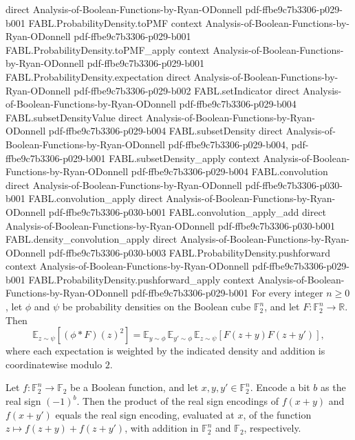 \begin{theorem}
  {direct}
  {Analysis-of-Boolean-Functions-by-Ryan-ODonnell}
  {pdf-ffbe9c7b3306-p029-b001}
\proofstep
  {FABL.ProbabilityDensity.toPMF}
  {context}
  {Analysis-of-Boolean-Functions-by-Ryan-ODonnell}
  {pdf-ffbe9c7b3306-p029-b001}
\proofstep
  {FABL.ProbabilityDensity.toPMF_apply}
  {context}
  {Analysis-of-Boolean-Functions-by-Ryan-ODonnell}
  {pdf-ffbe9c7b3306-p029-b001}
\proofstep
  {FABL.ProbabilityDensity.expectation}
  {direct}
  {Analysis-of-Boolean-Functions-by-Ryan-ODonnell}
  {pdf-ffbe9c7b3306-p029-b002}
\proofstep
  {FABL.setIndicator}
  {direct}
  {Analysis-of-Boolean-Functions-by-Ryan-ODonnell}
  {pdf-ffbe9c7b3306-p029-b004}
\proofstep
  {FABL.subsetDensityValue}
  {direct}
  {Analysis-of-Boolean-Functions-by-Ryan-ODonnell}
  {pdf-ffbe9c7b3306-p029-b004}
\proofstep
  {FABL.subsetDensity}
  {direct}
  {Analysis-of-Boolean-Functions-by-Ryan-ODonnell}
  {pdf-ffbe9c7b3306-p029-b004,
    pdf-ffbe9c7b3306-p029-b001}
\proofstep
  {FABL.subsetDensity_apply}
  {context}
  {Analysis-of-Boolean-Functions-by-Ryan-ODonnell}
  {pdf-ffbe9c7b3306-p029-b004}
\proofstep
  {FABL.convolution}
  {direct}
  {Analysis-of-Boolean-Functions-by-Ryan-ODonnell}
  {pdf-ffbe9c7b3306-p030-b001}
\proofstep
  {FABL.convolution_apply}
  {direct}
  {Analysis-of-Boolean-Functions-by-Ryan-ODonnell}
  {pdf-ffbe9c7b3306-p030-b001}
\proofstep
  {FABL.convolution_apply_add}
  {direct}
  {Analysis-of-Boolean-Functions-by-Ryan-ODonnell}
  {pdf-ffbe9c7b3306-p030-b001}
\proofstep
  {FABL.density_convolution_apply}
  {direct}
  {Analysis-of-Boolean-Functions-by-Ryan-ODonnell}
  {pdf-ffbe9c7b3306-p030-b003}
\proofstep
  {FABL.ProbabilityDensity.pushforward}
  {context}
  {Analysis-of-Boolean-Functions-by-Ryan-ODonnell}
  {pdf-ffbe9c7b3306-p029-b001}
\proofstep
  {FABL.ProbabilityDensity.pushforward_apply}
  {context}
  {Analysis-of-Boolean-Functions-by-Ryan-ODonnell}
  {pdf-ffbe9c7b3306-p029-b001}
For every integer $n \ge 0$, let $\phi$ and $\psi$ be probability densities on the
Boolean cube $\mathbb{F}_2^n$, and let $F:\mathbb{F}_2^n\to\mathbb{R}$. Then
\[
\mathbb{E}_{z\sim\psi}\!\left[(\phi*F)(z)^2\right]
=\mathbb{E}_{y\sim\phi}\,\mathbb{E}_{y'\sim\phi}\,\mathbb{E}_{z\sim\psi}\!\left[F(z+y)F(z+y')\right],
\]
where each expectation is weighted by the indicated density and addition is
coordinatewise modulo $2$.
\end{theorem}

\begin{theorem}
\label{FABL.realSignEncodedFunction_add_translates}
\leanok
{}
Let $f:\mathbb F_2^n\to\mathbb F_2$ be a Boolean function, and let $x,y,y'\in\mathbb
F_2^n$. Encode a bit $b$ as the real sign $(-1)^b$. Then the product of the real sign
encodings of $f(x+y)$ and $f(x+y')$ equals the real sign encoding, evaluated at $x$, of
the function $z\mapsto f(z+y)+f(z+y')$, with addition in $\mathbb F_2^n$ and $\mathbb
F_2$, respectively.
\end{theorem}

